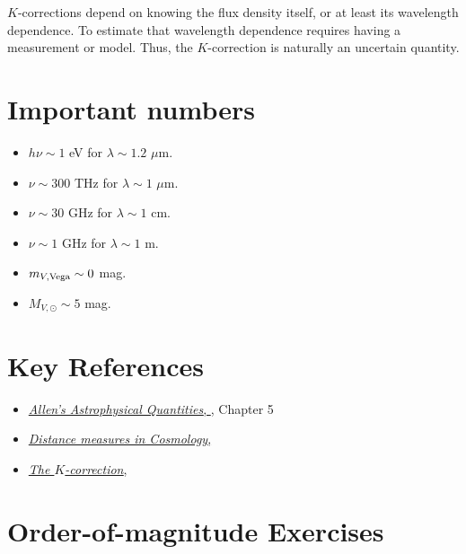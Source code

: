 $K$-corrections depend on knowing the flux density itself, or at least
its wavelength dependence. To estimate that wavelength dependence
requires having a measurement or model. Thus, the $K$-correction is
naturally an uncertain quantity.

\section{Important numbers}

\begin{itemize}
\item $h\nu \sim 1$ eV for $\lambda \sim 1.2$ $\mu$m.
\item $\nu \sim 300$ THz for $\lambda \sim 1$ $\mu$m.
\item $\nu \sim 30$ GHz for $\lambda \sim 1$ cm.
\item $\nu \sim 1$ GHz for $\lambda \sim 1$ m.
\item $m_{V, {\rm Vega}} \sim 0$ mag.
\item $M_{V, \odot} \sim 5$ mag.
\end{itemize}

\section{Key References}

\begin{itemize}
  \item
    \href{http://adsabs.harvard.edu/abs/2000asqu.book.....C}{
    {\it Allen's Astrophysical Quantities},
      \citet{cox00a}}, Chapter 5
  \item
    \href{http://adsabs.harvard.edu/abs/1999astro.ph..5116H}{
    {\it Distance measures in Cosmology},
      \citet{hogg99cosm}}
  \item
    \href{http://adsabs.harvard.edu/abs/2002astro.ph.10394H}{
    {\it The $K$-correction},
      \citet{hogg02c}}
\end{itemize}

\section{Order-of-magnitude Exercises}

